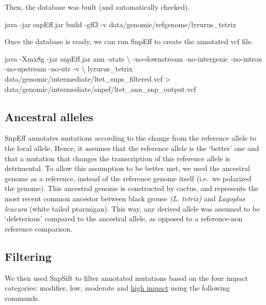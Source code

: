 \documentclass[
  letterpaper,
  DIV=11,
  numbers=noendperiod]{scrreprt}
\newenvironment{Shaded}{}{}
\newcommand{\NormalTok}[1]{\textcolor[rgb]{0.14,0.16,0.18}{#1}}
\begin{document}
Then, the database was built (and automatically checked).

\begin{Shaded}
\begin{Highlighting}[]
\NormalTok{java {-}jar snpEff.jar build {-}gff3 {-}v data/genomic/refgenome/lyrurus\_tetrix}
\end{Highlighting}
\end{Shaded}

Once the database is ready, we can run SnpEff to create the annotated
vcf file.

\begin{Shaded}
\begin{Highlighting}[]
\NormalTok{java {-}Xmx8g {-}jar snpEff.jar ann {-}stats  \textbackslash{}}
\NormalTok{{-}no{-}downstream {-}no{-}intergenic {-}no{-}intron {-}no{-}upstream {-}no{-}utr {-}v \textbackslash{}}
\NormalTok{lyrurus\_tetrix data/genomic/intermediate/ltet\_snps\_filtered.vcf \textgreater{} data/genomic/intermediate/snpef/ltet\_ann\_snp\_output.vcf}
\end{Highlighting}
\end{Shaded}

\subsection{Ancestral alleles}\label{ancestral-alleles}

SnpEff annotates mutations according to the change from the reference
allele to the focal allele. Hence, it assumes that the reference allele
is the `better' one and that a mutation that changes the transcription
of this reference allele is detrimental. To allow this assumption to be
better met, we used the ancestral genome as a reference, instead of the
reference genome itself (i.e.~we polarized the genome). This ancestral
genome is constructed by cactus, and represents the most recent common
ancestor between black grouse \emph{(L. tetrix)} and \emph{Lagoplus
leucura} (white tailed ptarmigan). This way, any derived allele was
assumed to be `deleterious' compared to the ancestral allele, as opposed
to a reference-non reference comparison.

\subsection{Filtering}\label{filtering}

We then used SnpSift to filter annotated mutations based on the four
impact categories: modifier, low, moderate and
\href{https://pcingola.github.io/SnpEff/se_inputoutput/\#effect-prediction-details}{high
impact} using the following commands.
\end{document}
